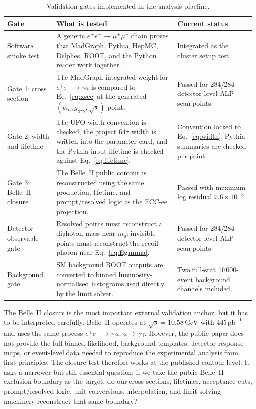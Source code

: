 \documentclass[12pt,a4paper]{article}
\newcommand{\gagg}{g_{a\gamma\gamma}}
\newcommand{\sqrts}{\sqrt{s}}
\newcommand{\GeV}{\,\text{GeV}}
\newcommand{\pbinv}{\,\text{pb}^{-1}}
\begin{document}
\begin{table}[h]
    \centering
    \caption{Validation gates implemented in the analysis pipeline.}
    \label{tab:gates}
    \begin{tabular}{p{}p{}p{}}
        \toprule
        Gate & What is tested & Current status \\
        \midrule
        Software smoke test &
        A generic $e^+e^-\to\mu^+\mu^-$ chain proves that MadGraph, Pythia,
        HepMC, Delphes, ROOT, and the Python reader work together. &
        Integrated as the cluster setup test. \\
        Gate 1: cross section &
        The MadGraph integrated weight for $e^+e^-\to\gamma a$ is compared to
        Eq.~\eqref{eq:xsec} at the generated $(m_a,\gagg,\sqrts)$ point. &
        Passed for 284/284 detector-level ALP scan points. \\
        Gate 2: width and lifetime &
        The UFO width convention is checked, the project $64\pi$ width is
        written into the parameter card, and the Pythia input lifetime is
        checked against Eq.~\eqref{eq:lifetime}. &
        Convention locked to Eq.~\eqref{eq:width}; Pythia summaries are checked
        per point. \\
        Gate 3: Belle~II closure &
        The Belle~II public contour is reconstructed using the same production,
        lifetime, and prompt/resolved logic as the FCC-ee projection. &
        Passed with maximum log residual $7.6\times10^{-3}$. \\
        Detector-observable gate &
        Resolved points must reconstruct a diphoton mass near $m_a$; invisible
        points must reconstruct the recoil photon near Eq.~\eqref{eq:Egamma}. &
        Passed for 284/284 detector-level ALP scan points. \\
        Background gate &
        SM background ROOT outputs are converted to binned luminosity-normalised
        histograms used directly by the limit solver. &
        Two full-stat 10\,000-event background channels included. \\
        \bottomrule
    \end{tabular}
\end{table}

The Belle~II closure is the most important external validation anchor, but it
has to be interpreted carefully.
Belle~II operates at $\sqrts = 10.58\GeV$ with $445\pbinv$ and uses the same
process $e^+e^-\to\gamma\,a$, $a\to\gamma\gamma$.
However, the public paper does not provide the full binned likelihood,
background templates, detector-response maps, or event-level data needed to
reproduce the experimental analysis from first principles.
The closure test therefore works at the published-contour level.
It asks a narrower but still essential question: if we take the public
Belle~II exclusion boundary as the target, do our cross sections, lifetimes,
acceptance cuts, prompt/resolved logic, unit conversions, interpolation, and
limit-solving machinery reconstruct that same boundary?
\end{document}
